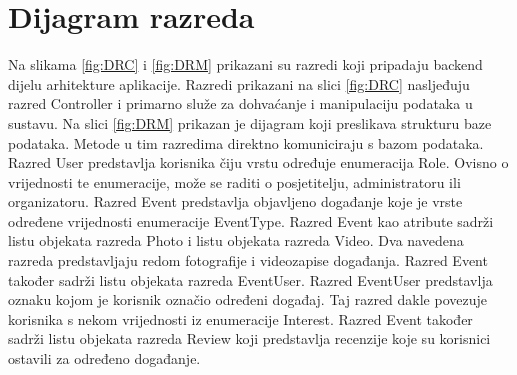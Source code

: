 			
		\section{Dijagram razreda}
		
		

		
			Na slikama \ref{fig:DRC} i \ref{fig:DRM} prikazani su razredi koji pripadaju backend dijelu arhitekture aplikacije. Razredi prikazani na slici \ref{fig:DRC} nasljeđuju razred Controller i primarno služe za dohvaćanje i manipulaciju podataka u sustavu. Na slici \ref{fig:DRM} prikazan je dijagram koji preslikava strukturu baze podataka. Metode u tim razredima direktno komuniciraju s bazom podataka. Razred User predstavlja korisnika čiju vrstu određuje enumeracija Role. Ovisno o vrijednosti te enumeracije, može se raditi o posjetitelju, administratoru ili organizatoru. Razred Event predstavlja objavljeno događanje koje je vrste određene vrijednosti enumeracije EventType. Razred Event kao atribute sadrži listu objekata razreda Photo i listu objekata razreda Video. Dva navedena razreda predstavljaju redom fotografije i videozapise događanja. Razred Event također sadrži listu objekata razreda EventUser. Razred EventUser predstavlja oznaku kojom je korisnik označio određeni događaj. Taj razred dakle povezuje korisnika s nekom vrijednosti iz enumeracije Interest. Razred Event također sadrži listu objekata razreda Review koji predstavlja recenzije koje su korisnici ostavili za određeno događanje.
		
